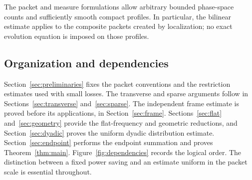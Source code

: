 The packet and measure formulations allow arbitrary bounded phase-space
counts and sufficiently smooth compact profiles. In particular, the
bilinear estimate applies to the composite packets created by localization;
no exact evolution equation is imposed on those profiles.

\subsection{Organization and dependencies}
Section~\ref{sec:preliminaries} fixes the packet conventions and the
restriction estimates used with small losses. The transverse and sparse
arguments follow in Sections~\ref{sec:transverse} and~\ref{sec:sparse}.
The independent frame estimate is proved before its applications, in
Section~\ref{sec:frame}. Sections~\ref{sec:flat} and~\ref{sec:geometry}
provide the flat-frequency and geometric reductions, and
Section~\ref{sec:dyadic} proves the uniform dyadic distribution estimate.
Section~\ref{sec:endpoint} performs the endpoint summation and proves
Theorem~\ref{thm:main}. Figure~\ref{fig:dependencies} records the logical
order. The distinction between a fixed power saving and an estimate
uniform in the packet scale is essential throughout.

